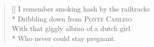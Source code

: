 \settowidth{\versewidth}{I remember smoking hash by the railtracks}
\begin{verse}[\versewidth]
I remember smoking hash by the railtracks\\*
\vin Dribbling down from \textsc{Ponte Casilino}\\
With that giggly albino of a dutch girl\\*
\vin Who never could stay pregnant.
\end{verse}
